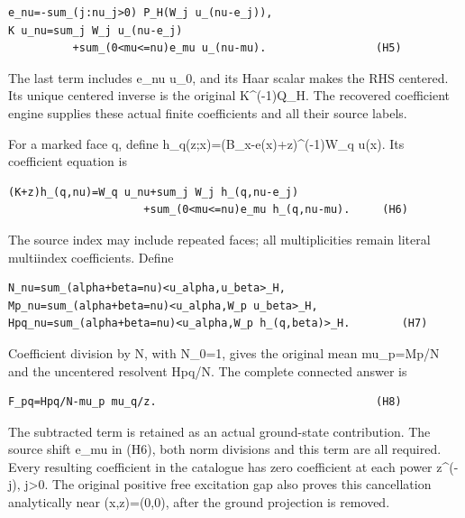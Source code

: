 \documentclass[11pt,a4paper]{article}
\renewcommand{\[}{\begingroup\small\originaldisplaystart}
\renewcommand{\]}{\originaldisplayend\endgroup}
\begin{document}
\begin{verbatim}
e_nu=-sum_(j:nu_j>0) P_H(W_j u_(nu-e_j)),
K u_nu=sum_j W_j u_(nu-e_j)
          +sum_(0<mu<=nu)e_mu u_(nu-mu).                 (H5)
\end{verbatim}

The last term includes e\_nu u\_0, and its Haar scalar makes the RHS
centered. Its unique centered inverse is the original K\^{}(-1)Q\_H. The
recovered coefficient engine supplies these actual finite coefficients
and all their source labels.

For a marked face q, define
{h\allowbreak{}\_\allowbreak{}q\allowbreak{}(\allowbreak{}z\allowbreak{};\allowbreak{}x\allowbreak{})\allowbreak{}=\allowbreak{}(\allowbreak{}B\allowbreak{}\_\allowbreak{}x\allowbreak{}-\allowbreak{}e\allowbreak{}(\allowbreak{}x\allowbreak{})\allowbreak{}+\allowbreak{}z\allowbreak{})\allowbreak{}\textasciicircum{}\allowbreak{}(\allowbreak{}-\allowbreak{}1\allowbreak{})\allowbreak{}W\allowbreak{}\_\allowbreak{}q\allowbreak{}}
u(x). Its coefficient equation is

\begin{verbatim}
(K+z)h_(q,nu)=W_q u_nu+sum_j W_j h_(q,nu-e_j)
                     +sum_(0<mu<=nu)e_mu h_(q,nu-mu).     (H6)
\end{verbatim}

The source index may include repeated faces; all multiplicities remain
literal multiindex coefficients. Define

\begin{verbatim}
N_nu=sum_(alpha+beta=nu)<u_alpha,u_beta>_H,
Mp_nu=sum_(alpha+beta=nu)<u_alpha,W_p u_beta>_H,
Hpq_nu=sum_(alpha+beta=nu)<u_alpha,W_p h_(q,beta)>_H.        (H7)
\end{verbatim}

Coefficient division by N, with N\_0=1, gives the original mean
mu\_p=Mp/N and the uncentered resolvent Hpq/N. The complete connected
answer is

\begin{verbatim}
F_pq=Hpq/N-mu_p mu_q/z.                                  (H8)
\end{verbatim}

The subtracted term is retained as an actual ground-state contribution.
The source shift e\_mu in (H6), both norm divisions and this term are
all required. Every resulting coefficient in the catalogue has zero
coefficient at each power z\^{}(-j), j\textgreater0. The original
positive free excitation gap also proves this cancellation analytically
near (x,z)=(0,0), after the ground projection is removed.
\end{document}
